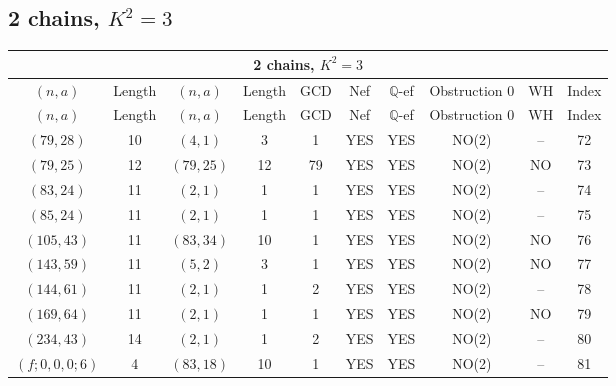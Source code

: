 \subsection{2 chains, $K^2 = 3$}
\begin{longtable}{|c|c|c|c|c|c|c|c|c|c|}
\hline
\multicolumn{10}{|c|}{2 chains, $K^2 = 3$}\\
\hline
$(n,a)$ & Length & $(n,a)$ & Length & GCD & Nef & $\mathbb Q$-ef & Obstruction 0 & WH & Index\\
\hline
\endfirsthead

\hline
$(n,a)$ & Length & $(n,a)$ & Length & GCD & Nef & $\mathbb Q$-ef & Obstruction 0 & WH & Index\\
\hline
\endhead
\hline
\endfoot

$(79, 28)$ & 10 & $(4, 1)$ & 3 & 1 & YES & YES & NO(2) & -- & 72\\
$(79, 25)$ & 12 & $(79, 25)$ & 12 & 79 & YES & YES & NO(2) & NO & 73\\
$(83, 24)$ & 11 & $(2, 1)$ & 1 & 1 & YES & YES & NO(2) & -- & 74\\
$(85, 24)$ & 11 & $(2, 1)$ & 1 & 1 & YES & YES & NO(2) & -- & 75\\
$(105, 43)$ & 11 & $(83, 34)$ & 10 & 1 & YES & YES & NO(2) & NO & 76\\
$(143, 59)$ & 11 & $(5, 2)$ & 3 & 1 & YES & YES & NO(2) & NO & 77\\
$(144, 61)$ & 11 & $(2, 1)$ & 1 & 2 & YES & YES & NO(2) & -- & 78\\
$(169, 64)$ & 11 & $(2, 1)$ & 1 & 1 & YES & YES & NO(2) & NO & 79\\
$(234, 43)$ & 14 & $(2, 1)$ & 1 & 2 & YES & YES & NO(2) & -- & 80\\
$(f; 0, 0, 0; 6)$ & 4 & $(83, 18)$ & 10 & 1 & YES & YES & NO(2) & -- & 81
\end{longtable}
